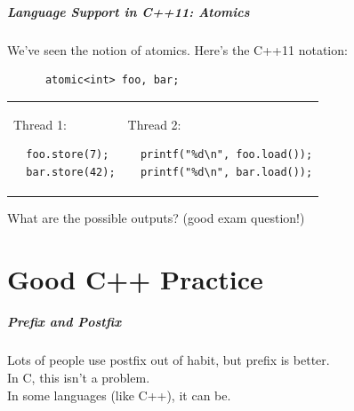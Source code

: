 \documentclass[aspectratio=43]{beamer}
\newenvironment{changemargin}[1]{%
  \begin{list}{}{%
    \setlength{\topsep}{0pt}%
    \setlength{\leftmargin}{#1}%
    \setlength{\rightmargin}{1em}
    \setlength{\listparindent}{\parindent}%
    \setlength{\itemindent}{\parindent}%
    \setlength{\parsep}{\parskip}%
  }%
  \item[]}{\end{list}}
\begin{document}
\begin{frame}[fragile]
  \frametitle{Language Support in C++11: Atomics}

  \begin{changemargin}{1.5cm}
    We've seen the notion of atomics. Here's the C++11 notation:

    \begin{lstlisting}
      atomic<int> foo, bar;      
    \end{lstlisting}
    
    \begin{tabular}{ll}
      \begin{minipage}{.25\textwidth}
        Thread 1:
        \begin{lstlisting}
  foo.store(7);
  bar.store(42);
        \end{lstlisting}
      \end{minipage} &
      \begin{minipage}{.45\textwidth}
        Thread 2:
        \begin{lstlisting}
  printf("%d\n", foo.load());
  printf("%d\n", bar.load());
        \end{lstlisting}
      \end{minipage}
    \end{tabular}

    What are the possible outputs? (good exam question!)
  \end{changemargin}
\end{frame}



\part{Good C++ Practice}
\frame{\partpage}

\begin{frame}
  \frametitle{Prefix and Postfix}

  \begin{changemargin}{1.5cm}

  Lots of people use postfix out of habit, but prefix is better.\\[2em]

  In C, this isn't a problem. \\[1em]
  In some languages (like C++), it can be.
  \end{changemargin}
\end{frame}
\end{document}
